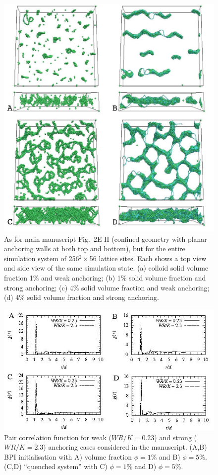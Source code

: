 \documentclass[12pt,twoside]{article}
\begin{document}
\begin{figure}
\begin{center}
\includegraphics[scale=0.42]{s4.jpg}
\end{center}
\caption{As for main manuscript Fig.~2E-H (confined geometry with planar
anchoring walls at both top and bottom), but for the entire simulation
system of 256$^2\times$56 lattice sites. Each shows a top view and
side view of the same simulation state. (a) colloid solid volume fraction 1\%
and weak anchoring; (b) 1\% solid volume fraction and strong anchoring;
(c) 4\% solid volume fraction and weak anchoring; (d) 4\% solid
volume fraction and strong anchoring.}
\end{figure}

\begin{figure}
\begin{center}
\includegraphics[width=0.95\columnwidth]{s5.jpg}
\end{center}
\caption{Pair correlation function for weak ($WR/K=0.23$) and strong ($WR/K=2.3$) anchoring cases considered in the manuscript. (A,B) BPI initialisation with A) volume fraction $\phi=1${\%} and B) $\phi=5${\%}. (C,D) ``quenched system'' with C) $\phi=1${\%} and D) $\phi=5${\%}.}
\end{figure}
\end{document}
